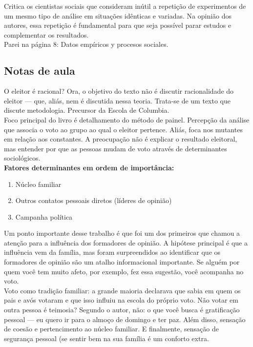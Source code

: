 \noindent Critica os cientistas sociais que consideram inútil a repetição de experimentos de um mesmo tipo de análise em situações idênticas e variadas. Na opinião dos autores, essa repetição é fundamental para que seja possível parar estudos e complementar os resultados. \\

\noindent Parei na página 8: Datos empíricos y procesos sociales.

\subsection{Notas de aula}

O eleitor é racional? Ora, o objetivo do texto não é discutir racionalidade do eleitor --- que, aliás, nem é discutida nessa teoria. Trata-se de um texto que discute metodologia. Precursor da Escola de Columbia. \\

\noindent Foco principal do livro é detalhamento do método de painel. Percepção da análise que associa o voto ao grupo ao qual o eleitor pertence. Aliás, foca nos mutantes em relação aos constantes. A preocupação não é explicar o resultado eleitoral, mas entender por que as pessoas mudam de voto através de determinantes sociológicos. \\

\noindent \textbf{Fatores determinantes em ordem de importância:}

\begin{enumerate}
    \item Núcleo familiar
    \item Outros contatos pessoais diretos (líderes de opinião)
    \item Campanha política
\end{enumerate}

\noindent Um ponto importante desse trabalho é que foi um dos primeiros que chamou a atenção para a influência dos formadores de opinião. A hipótese principal é que a influência vem da família, mas foram surpreendidos ao identificar que os formadores de opinião são um atalho informacional importante. Se alguém por quem você tem muito afeto, por exemplo, fez essa sugestão, você acompanha no voto. \\

\noindent Voto como tradição familiar: a grande maioria declarava que sabia em quem os pais e avós votaram e que isso influiu na escola do próprio voto. Não votar em outra pessoa é teimosia? Segundo o autor, não: o que você busca é gratificação pessoal --- eu quero ir para o almoço de domingo e ter paz. Além disso, sensação de coesão e pertencimento ao núcleo familiar. E finalmente, sensação de segurança pessoal (se sentir bem na sua família é um conforto extra. \\

